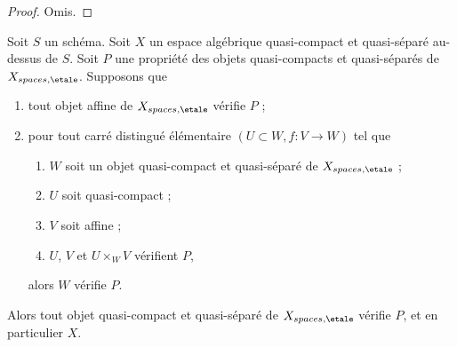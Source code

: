 \begin{proof}
Omis.
\end{proof}

\begin{lemma}
\label{lemma-induction-principle}
Soit $S$ un schéma. Soit $X$ un espace algébrique quasi-compact et quasi-séparé
au-dessus de $S$. Soit $P$ une propriété des objets quasi-compacts
et quasi-séparés de $X_{spaces, \etale}$. Supposons que
\begin{enumerate}
\item tout objet affine de $X_{spaces, \etale}$ v\'erifie $P$ ;
\item pour tout carré distingué élémentaire $(U \subset W, f : V \to W)$
tel que
\begin{enumerate}
\item $W$ soit un objet quasi-compact et quasi-séparé de
$X_{spaces, \etale}$ ;
\item $U$ soit quasi-compact ;
\item $V$ soit affine ;
\item $U$, $V$ et $U \times_W V$ v\'erifient $P$,
\end{enumerate}
alors $W$ v\'erifie $P$.
\end{enumerate}
Alors tout objet quasi-compact et quasi-séparé de
$X_{spaces, \etale}$ v\'erifie $P$, et en particulier $X$.
\end{lemma}


